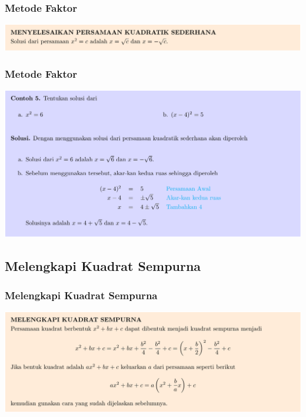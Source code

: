 \documentclass[pdflatex,compress,mathserif]{beamer}
\begin{document}
\begin{frame}
	\frametitle{Metode Faktor}
	\begin{center}
		\includegraphics[width=\linewidth]{img/img10}
	\end{center}
\end{frame}

\begin{frame}
	\frametitle{Metode Faktor}
	\begin{center}
		\includegraphics[width=\linewidth]{img/img11}
	\end{center}
\end{frame}

\subsection{Melengkapi Kuadrat Sempurna}

\begin{frame}
	\frametitle{Melengkapi Kuadrat Sempurna}
	\begin{center}
		\includegraphics[width=\linewidth]{img/img12}
	\end{center}
\end{frame}
\end{document}

